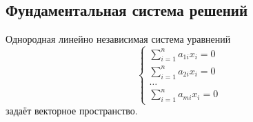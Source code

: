 \subsection{Фундаментальная система решений}
\begin{statement}
\label{st:homogeneous_system_sets_vector_space}
Однородная линейно независимая система уравнений
\begin{equation*}
\begin{cases}
\displaystyle \sum_{i=1}^n a_{1i} x_i = 0 \\
\displaystyle \sum_{i=1}^n a_{2i} x_i = 0 \\
\ldots \\
\displaystyle \sum_{i=1}^n a_{mi} x_i = 0
\end{cases}
\end{equation*}
задаёт векторное пространство.
\end{statement}
